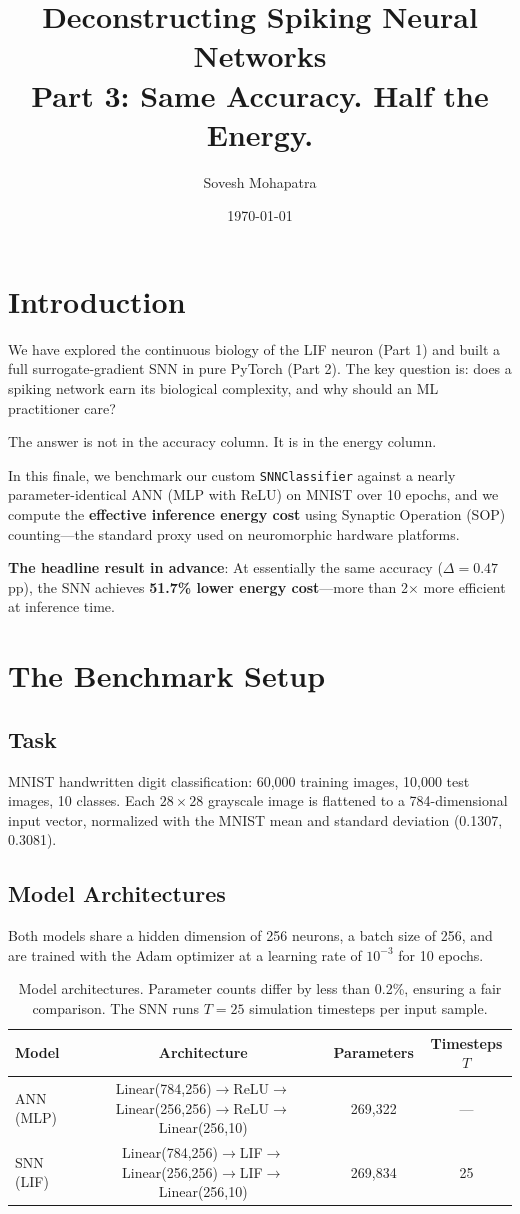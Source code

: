\documentclass[12pt]{article}
\title{\textbf{Deconstructing Spiking Neural Networks \\ Part 3: Same Accuracy. Half the Energy.}}
\author{Sovesh Mohapatra}
\date{\today}
\begin{document}
\maketitle

\section*{Introduction}
We have explored the continuous biology of the LIF neuron (Part 1) and built a full surrogate-gradient SNN in pure PyTorch (Part 2). The key question is: does a spiking network earn its biological complexity, and why should an ML practitioner care?

The answer is not in the accuracy column. It is in the energy column.

In this finale, we benchmark our custom \texttt{SNNClassifier} against a nearly parameter-identical ANN (MLP with ReLU) on MNIST over 10 epochs, and we compute the \textbf{effective inference energy cost} using Synaptic Operation (SOP) counting—the standard proxy used on neuromorphic hardware platforms.

\textbf{The headline result in advance}: At essentially the same accuracy ($\Delta = 0.47$ pp), the SNN achieves \textbf{51.7\% lower energy cost}—more than 2$\times$ more efficient at inference time.

\section*{The Benchmark Setup}

\subsection*{Task}
MNIST handwritten digit classification: 60,000 training images, 10,000 test images, 10 classes. Each $28 \times 28$ grayscale image is flattened to a 784-dimensional input vector, normalized with the MNIST mean and standard deviation (0.1307, 0.3081).

\subsection*{Model Architectures}
Both models share a hidden dimension of 256 neurons, a batch size of 256, and are trained with the Adam optimizer at a learning rate of $10^{-3}$ for 10 epochs.

\begin{table}[h]
\centering
\begin{tabular}{@{}lccc@{}}
\toprule
\textbf{Model} & \textbf{Architecture} & \textbf{Parameters} & \textbf{Timesteps $T$} \\
\midrule
ANN (MLP) & Linear(784,256)$\to$ReLU$\to$Linear(256,256)$\to$ReLU$\to$Linear(256,10) & 269,322 & --- \\
SNN (LIF) & Linear(784,256)$\to$LIF$\to$Linear(256,256)$\to$LIF$\to$Linear(256,10) & 269,834 & 25 \\
\bottomrule
\end{tabular}
\caption{Model architectures. Parameter counts differ by less than 0.2\%, ensuring a fair comparison. The SNN runs $T=25$ simulation timesteps per input sample.}
\end{table}
\end{document}
